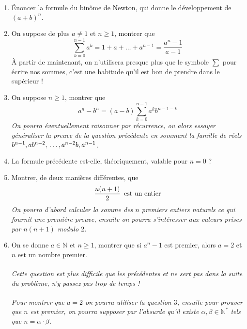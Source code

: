 \documentclass{article}
\newcommand{\N}{\mathbb{N}}
\begin{document}
\vspace{0.1 cm}
\begin{enumerate}[label=(\arabic*)]

    \item Énoncer la formule du binôme de Newton, qui donne le développement de $(a+b)^n$.
    \item On suppose de plus $a \neq 1$ et $n \geq 1$, montrer que 
    $$\sum_{k=0}^{n-1} a^k = 1 + a + \dots + a^{n-1} = \dfrac{a^n - 1}{a - 1}$$
    À partir de maintenant, on n'utilisera presque plus que le symbole $\sum$ pour écrire nos sommes, c'est une habitude qu'il est bon de prendre dans le supérieur !

    \item On suppose $n \geq 1$, montrer que 
    $$a^n - b^n = (a-b)\sum_{k=0}^{n-1} a^k b^{n-1-k}$$
    \textit{On pourra éventuellement raisonner par récurrence, ou alors essayer généraliser la preuve de la question précédente en sommant la famille de réels \thinspace\thinspace $b^{n-1}, ab^{n-2}, \thinspace \dots, a^{n-2}b, a^{n-1}$}.

    \vspace{0.2 cm}

    \item La formule précédente est-elle, théoriquement, valable pour $n=0$ ?
    \item Montrer, de deux manières différentes, que $$\dfrac{n(n+1)}{2} \thinspace \thinspace \thinspace \text{est un entier}$$
    \textit{On pourra d'abord calculer la somme des $n$ premiers entiers naturels ce qui fournit une première preuve, ensuite on pourra s'intéresser aux valeurs prises par $n(n+1)$ modulo $2$.}

    \vspace{0.2 cm}

    \item On se donne $a \in \N$ et $n \geq 1$, montrer que si $a^n -1$ est premier, alors $a = 2$ et $n$ est un nombre premier.\\
    \\
    \textit{Cette question est plus difficile que les précédentes et ne sert pas dans la suite du problème, n'y passez pas trop de temps !\\
    \\
    Pour montrer que $a = 2$ on pourra utiliser la question $3$, ensuite pour prouver que $n$ est premier, on pourra supposer par l'absurde qu'il existe $\alpha, \beta \in \N^*$ tels que $n = \alpha \cdot \beta$.}

    \vspace{0.2 cm}


\end{enumerate}
\end{document}

